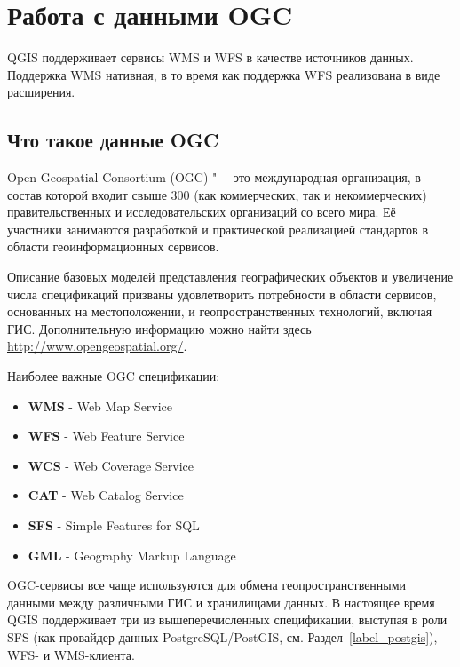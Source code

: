 \chapter{Работа с данными OGC}\label{working_with_ogc}


QGIS поддерживает сервисы WMS и WFS в качестве источников данных. Поддержка
WMS нативная, в то время как поддержка WFS реализована в виде расширения.

\section{Что такое данные OGC}

Open Geospatial Consortium (OGC) "--- это международная организация, в состав
которой входит свыше 300 (как коммерческих, так и некоммерческих)
правительственных и исследовательских организаций со всего мира. Её участники
занимаются разработкой и практической реализацией стандартов в области
геоинформационных сервисов.

Описание базовых моделей представления географических объектов и
увеличение числа спецификаций призваны удовлетворить потребности
в области сервисов, основанных на местоположении, и геопространственных
технологий, включая ГИС. Дополнительную информацию можно найти здесь
\url{http://www.opengeospatial.org/}.

Наиболее важные OGC спецификации:

\begin{itemize}[label=--]
\item \textbf{WMS} - Web Map Service
\item \textbf{WFS} - Web Feature Service
\item \textbf{WCS} - Web Coverage Service
\item \textbf{CAT} - Web Catalog Service
\item \textbf{SFS} - Simple Features for SQL
\item \textbf{GML} - Geography Markup Language
\end{itemize}

OGC-сервисы все чаще используются для обмена геопространственными
данными между различными ГИС и хранилищами данных. В настоящее время QGIS
поддерживает три из вышеперечисленных спецификации, выступая в роли SFS
(как провайдер данных PostgreSQL/PostGIS, см. Раздел~\ref{label_postgis}),
WFS- и WMS-клиента.

